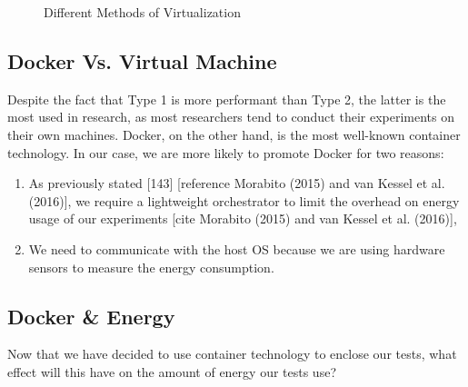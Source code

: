 \begin{figure}
    \caption{Different Methods of Virtualization}\label{environement:virtualization_technique}
\end{figure}


\subsection{Docker Vs. Virtual Machine}
Despite the fact that Type 1 is more performant than Type 2, the latter is the most used in research, as most researchers tend to conduct their experiments on their own machines. Docker, on the other hand, is the most well-known container technology. In our case, we are more likely to promote Docker for two reasons:
\begin{enumerate}
    \item As previously stated [143] [reference Morabito (2015) and van Kessel et al. (2016)], we require a lightweight orchestrator to limit the overhead on energy usage of our experiments
          \cite{van2016power}
          [cite Morabito (2015) and van Kessel et al. (2016)],
    \item We need to communicate with the host OS because we are using hardware sensors to measure the energy consumption.
\end{enumerate}



\subsection{Docker \& Energy}
Now that we have decided to use container technology to enclose our tests, what effect will this have on the amount of energy our tests use?


